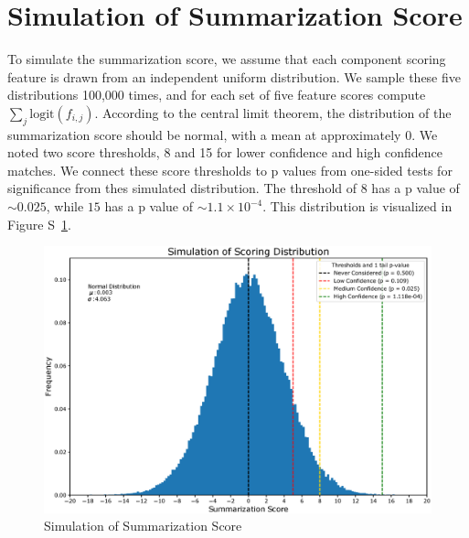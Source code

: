 \section{Simulation of Summarization Score}

To simulate the summarization score, we assume that each component scoring feature is
drawn from an independent uniform distribution. We sample these five distributions
100,000 times, and for each set of five feature scores compute $\sum_j\text{logit}(f_{i, j})$.
According to the central limit theorem, the distribution of the summarization score should be
normal, with a mean at approximately 0. We noted two score thresholds, 8 and 15 for lower
confidence and high confidence matches. We connect these score thresholds to p values from
one-sided tests for significance from thes simulated distribution. The threshold of $8$ has
a p value of $\sim0.025$, while $15$ has a p value of $\sim1.1\times10^{-4}$. This distribution
is visualized in Figure S~\ref{fig:simulation_of_score}.

\begin{figure}[!h]
    \caption{Simulation of Summarization Score\label{fig:simulation_of_score}}
    \includegraphics[width=.95\linewidth]{figure/simulation_of_scoring_distribution.eps}
\end{figure}
